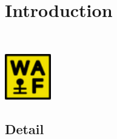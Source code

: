 \section{Introduction}
\lipsum[1]~\cite{texbook}

\includegraphics[width=2cm]{waf-logo.png}

\subsection{Detail}
\lipsum[2]~\cite{btxdoc}

\lipsum[3]~\cite{latexbook}

\lipsum[4]
